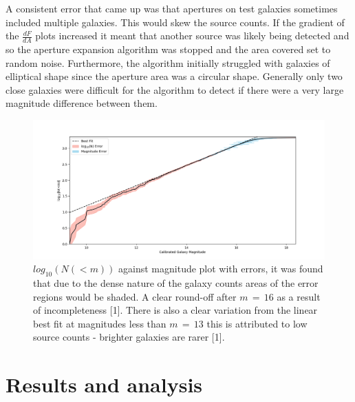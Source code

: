 \documentclass[journal]{IEEEtran}
\begin{document}
\noindent A consistent error that came up was that apertures on test galaxies sometimes included multiple galaxies. This would skew the source counts. If the gradient of the $\frac{d F}{d A}$ plots increased it meant that another source was likely being detected and so the aperture expansion algorithm was stopped and the area covered set to random noise. Furthermore, the algorithm initially struggled with galaxies of elliptical shape since the aperture area was a circular shape. Generally only two close galaxies were difficult for the algorithm to detect if there were a very large magnitude difference between them.
\begin{figure}[H]
    \centering
    \includegraphics[width = \linewidth]{Figure_8.png}
    \caption{$log_{10}(N(<m))$ against magnitude plot with errors, it was found that due to the dense nature of the galaxy counts areas of the error regions would be shaded. A clear round-off after $m\,=\,16$ as a result of incompleteness [1]. There is also a clear variation from the linear best fit at magnitudes less than $m\,=\,13$ this is attributed to low source counts - brighter galaxies are rarer [1].}
    \label{fig:6}
\end{figure}
\section{Results and analysis}
\end{document}
